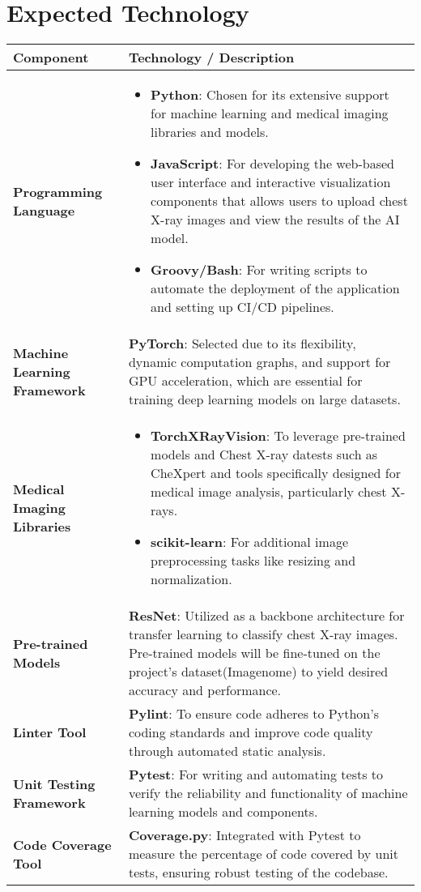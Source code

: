 \documentclass{article}
\begin{document}
\section{Expected Technology}
\renewcommand{\arraystretch}{1.5} 
\begin{table}[h!]
    \centering
    \begin{tabularx}{\textwidth}{| >{\raggedright\arraybackslash}m{3.5cm} | >{\raggedright\arraybackslash}X |}
        \hline
        \textbf{Component} & \textbf{Technology / Description} \\ \hline
        \textbf{Programming Language} & \begin{itemize}
          \item \textbf{Python}: Chosen for its extensive support for machine learning and medical imaging libraries and models.
          \item \textbf{JavaScript}: For developing the web-based user interface and interactive visualization components that allows users to upload chest X-ray images and view the results of the AI model.
          \item \textbf{Groovy/Bash}: For writing scripts to automate the deployment of the application and setting up CI/CD pipelines.
      \end{itemize} \\ \hline 
        \textbf{Machine Learning Framework} & \textbf{PyTorch}: Selected due to its flexibility, dynamic computation graphs, and support for GPU acceleration, which are essential for training deep learning models on large datasets. \\ \hline
        \textbf{Medical Imaging Libraries} & \begin{itemize}
            \item \textbf{TorchXRayVision}: To leverage pre-trained models and Chest X-ray datests such as CheXpert and tools specifically designed for medical image analysis, particularly chest X-rays. 
            \item \textbf{scikit-learn}: For additional image preprocessing tasks like resizing and normalization.
        \end{itemize} \\ \hline
        \textbf{Pre-trained Models} & \textbf{ResNet}: Utilized as a backbone architecture for transfer learning to classify chest X-ray images. Pre-trained models will be fine-tuned on the project’s dataset(Imagenome) to yield desired accuracy and performance. \\ \hline
        \textbf{Linter Tool} & \textbf{Pylint}: To ensure code adheres to Python's coding standards and improve code quality through automated static analysis. \\ \hline
        \textbf{Unit Testing Framework} & \textbf{Pytest}: For writing and automating tests to verify the reliability and functionality of machine learning models and components. \\ \hline
        \textbf{Code Coverage Tool} & \textbf{Coverage.py}: Integrated with Pytest to measure the percentage of code covered by unit tests, ensuring robust testing of the codebase. \\ \hline
        

\end{tabularx}
\end{table}
\end{document}
